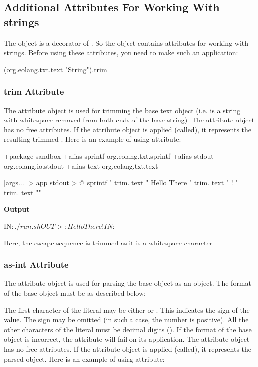 \documentclass[12pt]{book}
\begin{document}
{\subsection{Additional Attributes For Working With strings}
The object  is a decorator of . So the  object contains attributes for working with strings. Before using these attributes, you need to make such an application:
\begin{ffcode}
(org.eolang.txt.text "String").trim
\end{ffcode}

\subsubsection{trim Attribute}
The  attribute object is used for trimming the base text object (i.e.  is a string with whitespace removed from both ends of the base string).
The  attribute object has no free attributes.
If the  attribute object is applied (called), it represents the resulting trimmed . Here is an example of using  attribute:

\begin{ffcode}
+package sandbox
+alias sprintf org.eolang.txt.sprintf
+alias stdout org.eolang.io.stdout
+alias text org.eolang.txt.text

[args...] > app
  stdout > @
    sprintf
      "%
      trim.
        text "  Hello There  "
      trim.
        text "            !           "
      trim.
        text "\n"
\end{ffcode}
\textbf{Output}
\begin{ffcode}
IN$: ./run.sh
OUT>: Hello There!IN$:
\end{ffcode}

Here, the \ff{\n} escape sequence is trimmed as it is a
whitespace character.

\subsubsection{as-int Attribute}
The  attribute object is used for parsing the base  object as an  object.
The format of the base  object must be as described below:

The first character of the  literal may be either \ff{+} or \ff{-}. This indicates the sign of the  value. The sign may be omitted (in such a case, the number is positive).
All the other characters of the  literal must be decimal digits ().
If the format of the base  object is incorrect, the  attribute will fail on its application.
The  attribute object has no free attributes.
If the  attribute object is applied (called), it represents the parsed  object. Here is an example of using  attribute:

}
\end{document}
